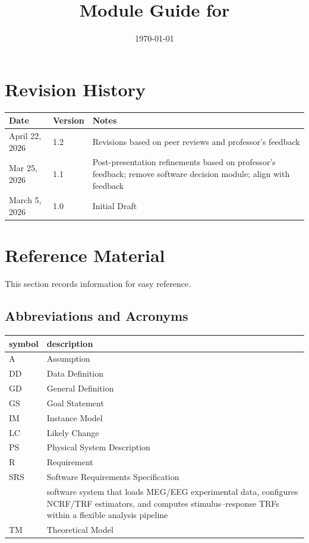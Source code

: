 \documentclass[12pt, titlepage]{article}
\begin{document}
\title{Module Guide for \progname{}} 
\author{\authname}
\date{\today}

\maketitle


\section{Revision History}

\begin{tabularx}{\textwidth}{p{3cm}p{2cm}X}
\toprule {\bf Date} & {\bf Version} & {\bf Notes}\\
\midrule
April 22, 2026 & 1.2 & Revisions based on peer reviews and professor's feedback\\
Mar 25, 2026 & 1.1 & Post-presentation refinements based on professor's feedback; remove software decision module; align with feedback\\
March 5, 2026 & 1.0 & Initial Draft\\
\bottomrule
\end{tabularx}

\newpage

\section{Reference Material}

This section records information for easy reference. 

\subsection{Abbreviations and Acronyms}

\renewcommand{\arraystretch}{1.2}
\begin{tabular}{l l}
  \toprule
  \textbf{symbol} & \textbf{description}\\
  \midrule
  A & Assumption\\
  DD & Data Definition\\
  GD & General Definition\\
  GS & Goal Statement\\
  IM & Instance Model\\
  LC & Likely Change\\
  PS & Physical System Description\\
  R & Requirement\\
  SRS & Software Requirements Specification\\
  \progname{} & software system that loads MEG/EEG experimental data, configures NCRF/TRF estimators, and computes stimulus–response TRFs within a flexible analysis pipeline\\
  TM & Theoretical Model\\
  \bottomrule
\end{tabular}\\
\end{document}
